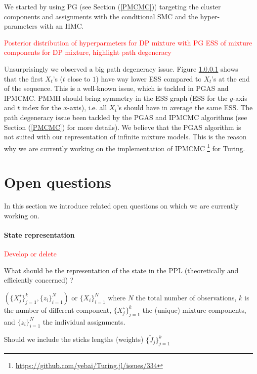 We started by using \acrlong{PG} (see Section (\ref{PMCMC})) targeting the cluster components and assignments with the conditional \gls{SMC} and the hyper-parameters with an \gls{HMC}.

\textcolor{red}{Posterior distribution of hyperparmeters for DP mixture with PG}
\textcolor{red}{ESS of mixture components for DP mixture, highlight path degeneracy}

Unsurprisingly we observed a big path degeneracy issue. Figure \ref{} shows that the first $X_t$'s ($t$ close to $1$) have way lower \gls{ESS} compared to $X_t$'s at the end of the sequence. This is a well-known issue, which is tackled in \gls{PGAS} and \gls{IPMCMC}.
\gls{PMMH} should bring symmetry in the \gls{ESS} graph (\gls{ESS} for the $y$-axis and $t$ index for the $x$-axis), i.e. all $X_t$'s should have in average the same \gls{ESS}.
The path degeneracy issue been tackled by the \gls{PGAS} and \gls{IPMCMC} algorithms (see Section (\ref{PMCMC}) for more details).
We believe that the \gls{PGAS} algorithm is not suited with our representation of infinite mixture models. This is the reason why we are currently working on the implementation of \gls{IPMCMC} \footnote{\url{https://github.com/yebai/Turing.jl/issues/334}} for Turing.


\section{Open questions}
In this section we introduce related open questions on which we are currently working on.


\paragraph{State representation}
\textcolor{red}{Develop or delete}

What should be the representation of the state in the PPL (theoretically and efficiently concerned) ?

$(\{X_j^\star\}_{j=1}^k, \{z_i\}_{i=1}^N)$ or $\{X_i\}_{i=1}^N$
where $N$ the total number of observations, $k$ is the number of different component, $\{X_j^\star\}_{j=1}^k$ the (unique) mixture components, and $\{z_i\}_{i=1}^N$ the individual assignments.

Should we include the sticks lengths (weights) $\{\tilde{J}_j\}_{j=1}^k$


